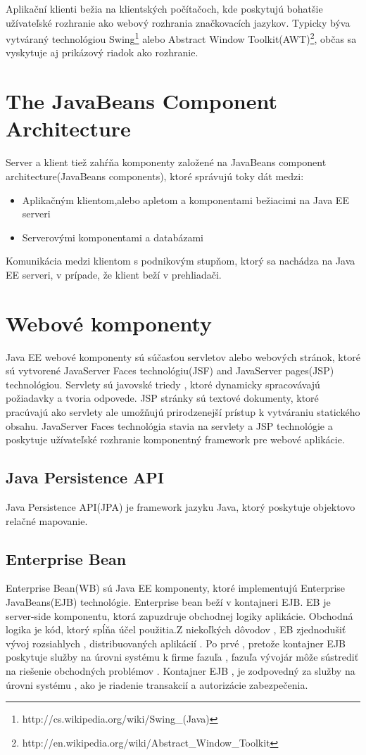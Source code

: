 Aplikační klienti bežia na klientských počítačoch, kde poskytujú bohatšie užívateľské rozhranie ako webový rozhrania značkovacích jazykov.
Typicky býva vytváraný technológiou Swing\footnote{http://cs.wikipedia.org/wiki/Swing\_(Java)} alebo Abstract Window Toolkit(AWT)\footnote{http://en.wikipedia.org/wiki/Abstract\_Window\_Toolkit}, občas sa vyskytuje aj prikázový riadok ako rozhranie.

\section{The JavaBeans Component Architecture}
Server a klient tiež zahŕňa komponenty založené na JavaBeans component architecture(JavaBeans components), ktoré správujú toky dát medzi:
\begin{itemize}
\item Aplikačným klientom,alebo apletom a komponentami bežiacimi na Java EE serveri
\item Serverovými komponentami a databázami
\end{itemize}


Komunikácia medzi klientom s podnikovým stupňom, ktorý sa nachádza na Java EE serveri, v prípade, že klient beží v prehliadači.

\section{Webové komponenty}
Java EE webové komponenty sú súčasťou servletov alebo webových stránok, ktoré sú vytvorené JavaServer Faces technológiu(JSF) and JavaServer pages(JSP) technológiou.
Servlety sú javovské triedy , ktoré dynamicky spracovávajú požiadavky a tvoria odpovede. JSP stránky sú textové dokumenty, ktoré pracúvajú ako servlety ale umožňujú prirodzenejší prístup k vytváraniu statického obsahu. JavaServer Faces technológia stavia na servlety a JSP technológie a poskytuje užívateľské rozhranie komponentný framework pre webové aplikácie.


\subsection{Java Persistence API}
Java Persistence API(JPA) je framework jazyku Java, ktorý poskytuje objektovo relačné mapovanie.

\subsection{Enterprise Bean}
Enterprise Bean(WB) sú Java EE komponenty, ktoré implementujú Enterprise JavaBeans(EJB) technológie. Enterprise bean beží v kontajneri EJB. EB je server-side komponentu, ktorá zapuzdruje obchodnej logiky aplikácie. Obchodná logika je kód, ktorý spĺňa účel použitia.Z niekoľkých dôvodov , EB zjednodušiť vývoj rozsiahlych , distribuovaných aplikácií . Po prvé , pretože kontajner EJB poskytuje služby na úrovni systému k firme fazuľa , fazuľa vývojár môže sústrediť na riešenie obchodných problémov . Kontajner EJB , je zodpovedný za služby na úrovni systému , ako je riadenie transakcií a autorizácie zabezpečenia.

